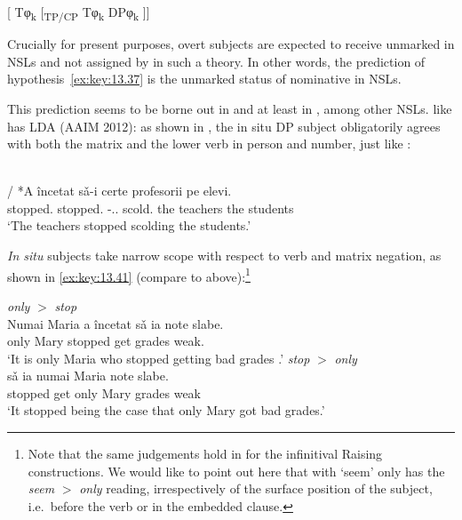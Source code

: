 \documentclass[output=paper]{langsci/langscibook}
\begin{document}
\begin{exe}
\ea\label{ex:key:13.39}
    {}[ Tφ\textsubscript{k} [\textsubscript{TP/CP} Tφ\textsubscript{k} DPφ\textsubscript{k} ]]
\z

Crucially for present purposes, overt subjects are expected to receive unmarked
\Nom{} in \glspl{NSL} and not \Nom{} assigned by  in such a theory.
In other words, the prediction of hypothesis~\eqref{ex:key:13.37} is the
unmarked status of nominative in NSLs.

This prediction seems to be borne out in  and at least in , among
other NSLs.  like  has \gls{LDA} (AAIM 2012): as shown in
, the in situ DP subject obligatorily agrees with both the
matrix and the lower verb in person and number, just like :

\ea\label{ex:key:13.40}\\
     / {*A încetat} sǎ-i certe profesorii pe elevi.\\
    stopped.\Tpl{} {} \hphantom{*}stopped.\Tsg{} \Sbjv{}-\Cl{}.\Tpl{}.\Acc{} scold.\Tpl{} {the teachers} the students\\
    \glt ‘The teachers stopped scolding the students.’
\z

\emph{In situ} subjects take narrow scope with respect to  verb and
matrix negation, as shown in \eqref{ex:key:13.41} (compare to 
above):\footnote{Note that the same judgements hold in  for the
    infinitival Raising constructions. We would like to point out here that
    with `seem'  only has the \emph{seem} $>$ \emph{only} reading,
irrespectively of the surface position of the subject, i.e.\ before the 
verb or in the embedded clause.}

\ea%
    \label{ex:key:13.41}
    \ea \emph{only} $>$ \emph{stop}\\
    \gll   Numai Maria {a încetat} sǎ   ia note slabe.\\
	    only Mary stopped \Sbjv{} get grades weak.\\
	\glt     ‘It is only Maria who stopped getting bad grades .’
    \ex \emph{stop} $>$ \emph{only}\\
     sǎ  ia numai Maria note slabe.\\
	    stopped \Sbjv{} get only Mary grades weak\\
	\glt     ‘It stopped being the case that only Mary got bad grades.’
    \z
\z


\end{exe}
\end{document}
